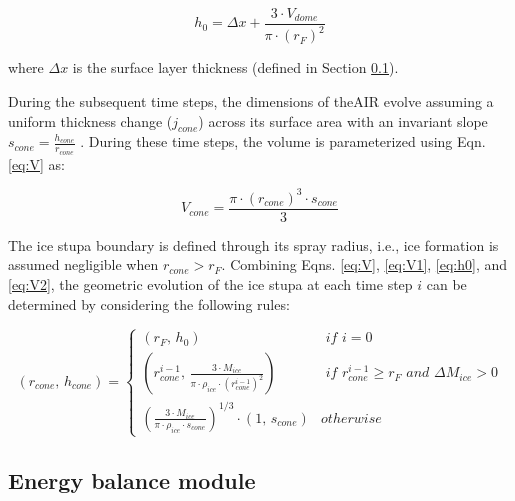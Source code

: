 \begin{equation}
	h_{0} =  \Delta x + \frac{3 \cdot V_{dome}}{\pi \cdot (r_F)^2 }
	\label{eq:h0}
\end{equation}

where $\Delta x$ is the surface layer thickness (defined in Section \ref{sec:energy}).

During the subsequent time steps, the dimensions of the\ac{AIR} evolve assuming a uniform thickness change ($j_{cone}$)
across its surface area with an invariant slope $s_{cone} = \frac{h_{cone}}{r_{cone}}$ .  During these time
steps, the volume is parameterized using Eqn. \ref{eq:V} as:

\begin{equation} 
  V_{cone} = \frac{\pi \cdot {(r_{cone})}^3 \cdot s_{cone}}{3} 
\label{eq:V2} 
\end{equation}

The ice stupa boundary is defined through its spray radius, i.e., ice formation is assumed negligible when
$r_{cone} > r_{F}$. Combining Eqns. \ref{eq:V},  \ref{eq:V1}, \ref{eq:h0}, and \ref{eq:V2}, the geometric
evolution of the ice stupa at each time step $i$ can be determined by considering the following rules:

\begin{equation} (r_{cone},\, h_{cone}) = \left\{ \begin{array}{ll} (r_F ,\, h_0)                                                                          & \textit{ if } i=0 \\
             (r_{cone}^{i-1},\, \frac{3 \cdot M_{ice}}{\pi \cdot \rho_{ice} \cdot {(r_{cone}^{i-1})}^2}) & \textit{ if }
             r_{cone}^{i-1} \geq r_{F} \textit{ and } \Delta M_{ice} > 0                                                     \\ (\frac{3 \cdot M_{ice}}{\pi \cdot \rho_{ice} \cdot s_{cone}})^{1/3} \cdot (1,\,  s_{cone}) &
             otherwise\end{array} \right.  \label{eq:A2} \end{equation}

\subsection{Energy balance module} \label{sec:energy}

